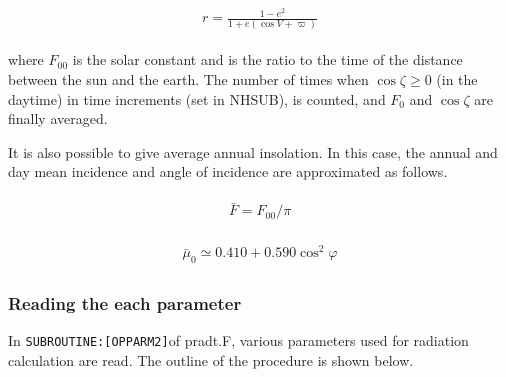 \begin{eqnarray}
\begin{array}{c}
r=\frac{1-e^{2}}{1+e(\cos V+\varpi)}
\end{array}
\end{eqnarray}

where \(F_{00}\) is the solar constant and is the ratio to the time of the distance between the sun and the earth. The number of times when \(\cos \zeta \geq 0\) (in the daytime) in time increments
(set in NHSUB), is counted, and \(F_{0}\) and \(\cos \zeta\) are finally averaged.

It is also possible to give average annual insolation. In this case, the annual and day mean incidence and angle of incidence are approximated as follows.

\begin{eqnarray}
\begin{array}{c}
\bar{F}=F_{00} / \pi
\end{array}
\end{eqnarray}

\begin{eqnarray}
\begin{array}{c}
\bar{\mu}_{0} \simeq 0.410+0.590 \cos ^{2} \varphi
\end{array}
\end{eqnarray}

\hypertarget{reading-the-each-parameter}{%
\subsubsection{Reading the each parameter}\label{reading-the-each-parameter}}

In \texttt{SUBROUTINE:{[}OPPARM2{]}}of pradt.F, various parameters used for radiation calculation are read. The outline of the procedure is shown below.

